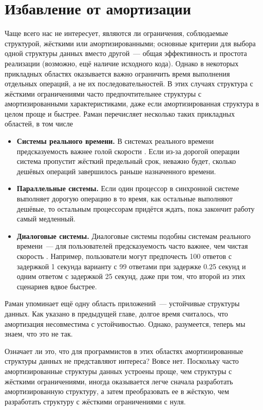 \chapter{Избавление от амортизации}
\label{ch:7}

Чаще всего нас не интересует, являются ли ограничения, соблюдаемые
структурой, жёсткими или амортизированными; основные критерии для
выбора одной структуры данных вместо другой~--- общая эффективность и
простота реализации (возможно, ещё наличие исходного кода). Однако в
некоторых прикладных областях оказывается важно ограничить время
выполнения отдельных операций, а не их последовательностей. В
этих случаях структура с жёсткими ограничениями часто предпочтительнее
структуры с амортизированными характеристиками, даже если
амортизированная структура в целом проще и быстрее. Раман
\cite{Raman1992} перечисляет несколько таких прикладных областей, в
том числе
\begin{itemize}
\item \textbf{Системы реального времени.} В системах реального времени
  предсказуемость важнее голой скорости \cite{Stankovic1988}. Если
  из-за дорогой операции система пропустит жёсткий
  предельный срок, неважно будет, сколько дешёвых операций завершилось
  раньше назначенного времени.
\item \textbf{Параллельные системы.} Если один процессор в синхронной
  системе выполняет дорогую операцию в то время, как остальные
  выполняют дешёвые, то остальным процессорам придётся ждать, пока
  закончит работу самый медленный.
\item \textbf{Диалоговые системы.} Диалоговые системы подобны системам
  реального времени~--- для пользователей предсказуемость часто
  важнее, чем чистая скорость \cite{Butler1983}. Например,
  пользователи могут предпочесть 100 ответов с задержкой 1 секунда
  варианту с 99 ответами при задержке 0.25 секунд и одним ответом с
  задержкой 25 секунд, даже при том, что второй из этих сценариев
  вдвое быстрее.
\end{itemize}
\begin{remark}
  Раман упоминает ещё одну область приложений~--- устойчивые структуры
  данных. Как указано в предыдущей главе, долгое время считалось,
  что амортизация несовместима с устойчивостью. Однако, разумеется,
  теперь мы знаем, что это не так.
\end{remark}

Означает ли это, что для программистов в этих областях
амортизированные структуры данных не представляют интереса? Вовсе
нет. Поскольку часто амортизированные структуры данных устроены проще,
чем структуры с жёсткими ограничениями, иногда оказывается легче
сначала разработать амортизированную структуру, а затем преобразовать
ее в жёсткую, чем разработать структуру с жёсткими ограничениями с
нуля.

